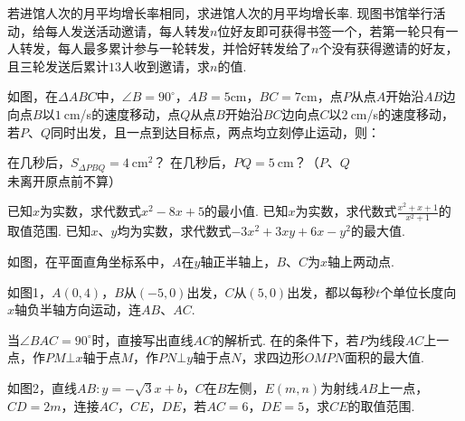 \documentclass[10pt]{article}
\begin{document}
\begin{questions}{\answeringintroduction}
\begin{subquestions}
        \subquestion 若进馆人次的月平均增长率相同，求进馆人次的月平均增长率.
        \subquestion 现图书馆举行活动，给每人发送活动邀请，每人转发$n$位好友即可获得书签一个，若第一轮只有一人转发，每人最多累计参与一轮转发，并恰好转发给了$n$个没有获得邀请的好友，且三轮发送后累计$13$人收到邀请，求$n$的值.
    \end{subquestions}
    \addspace{}
    \question 如图，在$\Delta ABC$中，$\angle B=90^{\circ}$，$AB=5$cm，$BC=7$cm，点$P$从点$A$开始沿$AB$边向点$B$以$1\ $cm/s的速度移动，点$Q$从点$B$开始沿$BC$边向点$C$以$2\ $cm/s的速度移动，若$P$、$Q$同时出发，且一点到达目标点，两点均立刻停止运动，则：
    \begin{subquestions}
        \subquestion 在几秒后，$S_{\Delta PBQ}=4\ $cm$^2$？
        \subquestion 在几秒后，$PQ=5\ $cm？（$P$、$Q$未离开原点前不算）
    \end{subquestions}
    \begin{figure}[!h]
        \raggedleft
    \end{figure}
    \question
    \begin{subquestions}
        \subquestion 已知$x$为实数，求代数式$x^2-8x+5$的最小值.
        \subquestion 已知$x$为实数，求代数式${\frac{x^2+x+1}{x^2+1}}$的取值范围.
        \subquestion 已知$x$、$y$均为实数，求代数式$-3x^2+3xy+6x-y^2$的最大值.
    \end{subquestions}
    \newpage{}
    \question 如图，在平面直角坐标系中，$A$在$y$轴正半轴上，$B$、$C$为$x$轴上两动点.
    \begin{subquestions}
        \subquestion 如图1，$A(0,4)$，$B$从$(-5,0)$出发，$C$从$(5,0)$出发，都以每秒$t$个单位长度向$x$轴负半轴方向运动，连$AB$、$AC$.
        \begin{subsubquestions}
            \subsubquestion 当$\angle BAC=90^{\circ}$时，直接写出直线$AC$的解析式.
            \subsubquestion 在的条件下，若$P$为线段$AC$上一点，作$PM \bot x$轴于点$M$，作$PN \bot y$轴于点$N$，求四边形$OMPN$面积的最大值.
        \end{subsubquestions}
        \subquestion 如图2，直线$AB:y=-\sqrt{3}x+b$，$C$在$B$左侧，$E(m,n)$为射线$AB$上一点，$CD=2m$，连接$AC$，$CE$，$DE$，若$AC=6$，$DE=5$，求$CE$的取值范围.

\end{subquestions}
\end{questions}
\end{document}
